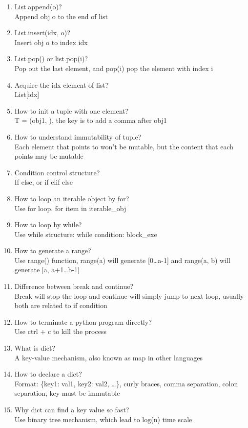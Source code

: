 \documentclass[10pt,a4paper,oneside]{article}
\begin{document}
\begin{enumerate}[1.]
 \item List.append(o)?\\
 Append obj o to the end of list
 \item List.insert(idx, o)?\\
 Insert obj o to index idx
 \item List.pop() or list.pop(i)?\\
 Pop out the last element, and pop(i) pop the element with index i
 \item Acquire the idx element of list?\\
 List[idx]
\item How to init a tuple with one element?\\
T = (obj1, ), the key is to add a comma after obj1
\item How to understand immutability of tuple?\\
Each element that points to won't be mutable, but the content that each points may be mutable
\item Condition control structure?\\
If else, or if elif else
\item How to loop an iterable object by for?\\
Use for loop, for item in iterable\_obj
\item How to loop by while?\\
Use while structure: while condition: block\_exe
\item How to generate a range?\\
Use range() function, range(a) will generate [0\dots a-1] and range(a, b) will generate [a, a+1\dots b-1]
\item Difference between break and continue?\\
Break will stop the loop and continue will simply jump to next loop, usually both are related to if condition
\item How to terminate a python program directly?\\
Use ctrl + c to kill the process
\item What is dict?\\
A key-value mechanism, also known as map in other languages
\item How to declare a dict?\\
Format: \{key1: val1, key2: val2, \dots\}, curly braces, comma separation, colon separation, key must be immutable
\item Why dict can find a key value so fast?\\
Use binary tree mechanism, which lead to log(n) time scale

\end{enumerate}
\end{document}
